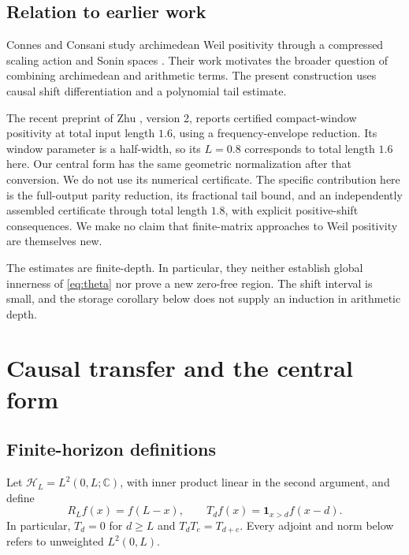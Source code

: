 \documentclass[11pt]{article}
\numberwithin{equation}{section}
\theoremstyle{definition}
\theoremstyle{remark}
\newcommand{\HH}{\mathcal H}
\newcommand{\CC}{\mathbb C}
\begin{document}
\subsection{Relation to earlier work}

Connes and Consani study archimedean Weil positivity through a compressed
scaling action and Sonin spaces \cite{ConnesConsani2020}. Their work motivates
the broader question of combining archimedean and arithmetic terms.
The present construction uses causal shift differentiation and a polynomial
tail estimate.

The recent preprint of Zhu \cite{Zhu2026}, version 2, reports certified
compact-window positivity at total input length $1.6$, using a
frequency-envelope reduction. Its window parameter is a half-width, so its
$L=0.8$ corresponds to total length $1.6$ here. Our central form has the same
geometric normalization after that conversion. We do not use its numerical
certificate. The specific contribution here is the full-output parity
reduction, its fractional tail bound, and an independently assembled
certificate through total length $1.8$, with explicit positive-shift
consequences. We make no claim that finite-matrix approaches to Weil
positivity are themselves new.

The estimates are finite-depth. In particular, they neither establish global
innerness of \eqref{eq:theta} nor prove a new zero-free region. The shift
interval is small, and the storage corollary below does not supply an induction
in arithmetic depth.

\section{Causal transfer and the central form}\label{sec:operators}

\subsection{Finite-horizon definitions}

Let $\HH_L=L^2(0,L;\CC)$, with inner product linear in the second argument,
and define
\[
 R_Lf(x)=f(L-x),\qquad T_df(x)=\mathbf1_{x>d}f(x-d).
\]
In particular, $T_d=0$ for $d\ge L$ and
$T_dT_e=T_{d+e}$. Every adjoint and norm below refers to unweighted
$L^2(0,L)$.
\end{document}
